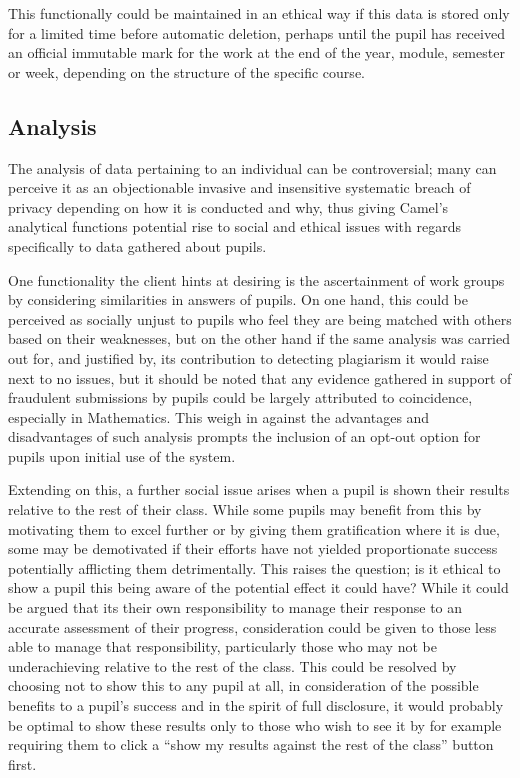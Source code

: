 This functionally could be maintained in an ethical way if this data is stored only for a limited time before automatic deletion, perhaps until the pupil has received an official immutable mark for the work at the end of the year, module, semester or week, depending on the structure of the specific course.

\newpage
{}
\subsection*{Analysis}
The analysis of data pertaining to an individual can be controversial; many can perceive it as an objectionable invasive and insensitive systematic breach of privacy depending on how it is conducted and why, thus giving Camel’s analytical functions potential rise to social and ethical issues with regards specifically to data gathered about pupils.

One functionality the client hints at desiring is the ascertainment of work groups by considering similarities in answers of pupils. On one hand, this could be perceived as socially unjust to pupils who feel they are being matched with others based on their weaknesses, but on the other hand if the same analysis was carried out for, and justified by, its contribution to detecting plagiarism it would raise next to no issues, but it should be noted that any evidence gathered in support of fraudulent submissions by pupils could be largely attributed to coincidence, especially in Mathematics. This weigh in against the advantages and disadvantages of such analysis prompts the inclusion of an opt-out option for pupils upon initial use of the system.

Extending on this, a further social issue arises when a pupil is shown their results relative to the rest of their class. While some pupils may benefit from this by motivating them to excel further or by giving them gratification where it is due, some may be demotivated if their efforts have not yielded proportionate success potentially afflicting them detrimentally. This raises the question; is it ethical to show a pupil this being aware of the potential effect it could have? While it could be argued that its their own responsibility to manage their response to an accurate assessment of their progress, consideration could be given to those less able to manage that responsibility, particularly those who may not be underachieving relative to the rest of the class. This could be resolved by choosing not to show this to any pupil at all, in consideration of the possible benefits to a pupil’s success and in the spirit of full disclosure, it would probably be optimal to show these results only to those who wish to see it by for example requiring them to click a “show my results against the rest of the class” button first.

